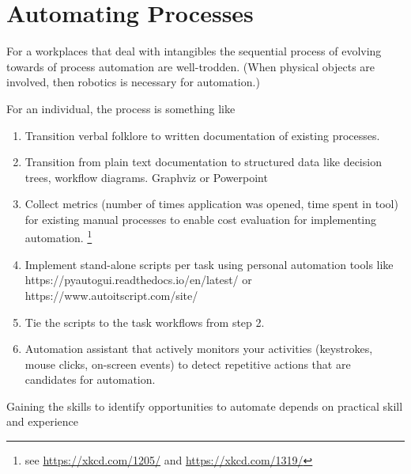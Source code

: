 \section{Automating Processes}


For a workplaces that deal with intangibles the sequential process of evolving towards of process automation are well-trodden.  (When physical objects are involved, then robotics is necessary for automation.)



For an individual, the process is something like
\begin{enumerate}
    \item Transition verbal folklore to written documentation of existing processes.
    \item Transition from plain text documentation to structured data like decision trees, workflow diagrams. Graphviz or Powerpoint
    \item Collect metrics (number of times application was opened, time spent in tool) for existing manual processes to enable cost evaluation for implementing automation. \footnote{see \href{https://xkcd.com/1205/}{https://xkcd.com/1205/} and \href{https://xkcd.com/1319/}{https://xkcd.com/1319/}}
    \item Implement stand-alone scripts per task using personal automation tools like https://pyautogui.readthedocs.io/en/latest/ or https://www.autoitscript.com/site/
    \item Tie the scripts to the task workflows from step 2.
    \item Automation assistant that actively monitors your activities (keystrokes, mouse clicks, on-screen events) to detect repetitive actions that are candidates for automation.
\end{enumerate}

Gaining the skills to identify opportunities to automate depends on practical skill and experience


